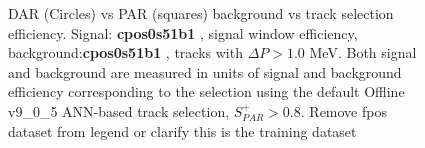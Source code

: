 \begin{figure}[H]
  \hspace{-0.6in}
  \caption{
    \label{fig:mumep_trq_ann} 
    DAR (Circles) vs PAR (squares) background vs track selection efficiency.
    Signal: {\bf cpos0s51b1} , signal window {\blue efficiency}, background:{\bf cpos0s51b1} , tracks with $\Delta{P} > 1.0$ MeV.
    Both signal and background are measured in units of signal and background {\blue efficiency} corresponding to the selection
    using {\blue the} default Offline v9\_0\_5 ANN-based track selection, $S_{PAR}^+ > 0.8$.
    {\blue Remove fpos dataset from legend or clarify this is the training dataset}
  }
\end{figure}

